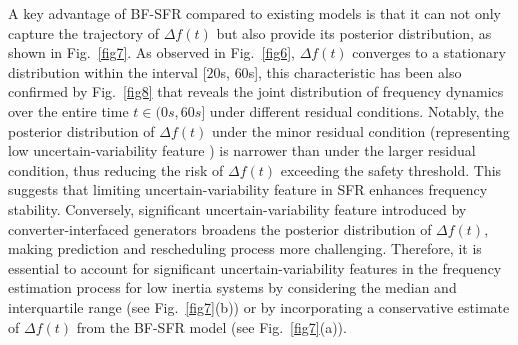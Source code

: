 \documentclass[lettersize,journal]{IEEEtran}
\begin{document}

A key advantage of BF-SFR compared to existing models is that it can not only capture the trajectory of $\varDelta f(t)$ but also provide its posterior distribution, as shown in Fig.~\ref{fig7}. As observed in Fig.~\ref{fig6}, $\varDelta f(t)$ converges to a stationary distribution within the interval [$20$s, $60$s], this characteristic has been also confirmed by Fig.~\ref{fig8} that reveals the joint distribution of frequency dynamics over the entire time $t\in (0s, 60s]$ under different residual conditions. Notably, the posterior distribution of $\varDelta f(t)$ under the minor residual condition (representing low uncertain-variability feature ) is narrower than under the larger residual condition, thus reducing the risk of $\varDelta f(t)$ exceeding the safety threshold. This suggests that limiting uncertain-variability feature in SFR enhances frequency stability. Conversely, significant uncertain-variability feature introduced by converter-interfaced generators broadens the posterior distribution of $\varDelta f(t)$, making prediction and rescheduling process more challenging. Therefore, it is essential to account for significant uncertain-variability features in the frequency estimation process for low inertia systems by considering the median and interquartile range (see Fig.~\ref{fig7}(b)) or by incorporating a conservative estimate of $\varDelta f(t)$ from the BF-SFR model (see Fig.~\ref{fig7}(a)).
\end{document}
